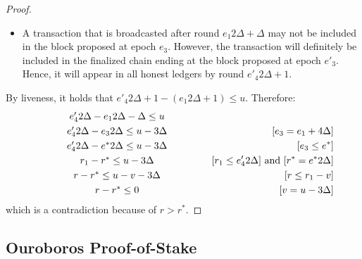 \begin{proof}
\begin{itemize}
    \item A transaction that is broadcasted after round $e_1 2 \Delta + \Delta$
      may not be included in the block proposed at epoch $e_3$.
      However, the transaction will definitely be included
      in the finalized chain ending at the block proposed at epoch $e'_3$.
      Hence, it will appear in all honest ledgers by round $e'_4 2 \Delta + 1$.
  \end{itemize}

  By liveness, it holds that $e'_4 2 \Delta + 1 - (e_1 2 \Delta + 1) \leq u$.
  Therefore:
  \begin{align*}
    \makebox[0.5\textwidth][c]{$e'_4 2 \Delta - e_1 2 \Delta - \Delta \leq u$}   && \\
    \makebox[0.5\textwidth][c]{$e'_4 2 \Delta - e_3 2 \Delta \leq u - 3 \Delta$} && \text{[$e_3 = e_1 + 4 \Delta$]} \\
    \makebox[0.5\textwidth][c]{$e'_4 2 \Delta - e^* 2 \Delta \leq u - 3 \Delta$} && \text{[$e_3 \leq e^*$]} \\
    \makebox[0.5\textwidth][c]{$r_1 - r^* \leq u - 3 \Delta$}                    && \text{[$r_1 \leq e'_4 2 \Delta$] and [$r^* = e^* 2 \Delta$]} \\
    \makebox[0.5\textwidth][c]{$r - r^* \leq u - v - 3 \Delta$}                  && \text{[$r \leq r_1 - v$]} \\
    \makebox[0.5\textwidth][c]{$r - r^* \leq 0$}                                 && \text{[$v = u - 3 \Delta$]}
  \end{align*}
  which is a contradiction because of $r > r^*$.

  \Qed
\end{proof}




\subsection{Ouroboros Proof-of-Stake}

